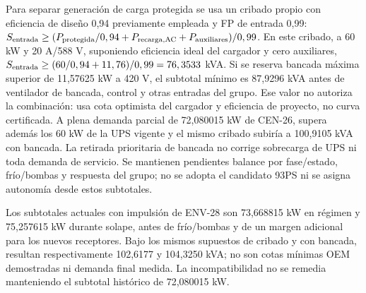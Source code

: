 Para separar generación de carga protegida se usa un cribado propio con eficiencia de diseño 0,94 previamente empleada y FP de entrada 0,99: $S_{\rm entrada}\ge(P_{\rm protegida}/0,94+P_{\rm recarga,AC}+P_{\rm auxiliares})/0,99$. En este cribado, a 60 kW y 20 A/588 V, suponiendo eficiencia ideal del cargador y cero auxiliares, $S_{\rm entrada}\ge(60/0,94+11,76)/0,99=76,3533$ kVA. Si se reserva bancada máxima superior de 11,57625 kW a 420 V, el subtotal mínimo es 87,9296 kVA antes de ventilador de bancada, control y otras entradas del grupo. Ese valor no autoriza la combinación: usa cota optimista del cargador y eficiencia de proyecto, no curva certificada. A plena demanda parcial de 72,080015 kW de CEN-26, supera además los 60 kW de la UPS vigente y el mismo cribado subiría a 100,9105 kVA con bancada. La retirada prioritaria de bancada no corrige sobrecarga de UPS ni toda demanda de servicio. Se mantienen pendientes balance por fase/estado, frío/bombas y respuesta del grupo; no se adopta el candidato 93PS ni se asigna autonomía desde estos subtotales.


Los subtotales actuales con impulsión de ENV-28 son 73,668815 kW en régimen y 75,257615 kW durante solape, antes de frío/bombas y de un margen adicional para los nuevos receptores. Bajo los mismos supuestos de cribado y con bancada, resultan respectivamente 102,6177 y 104,3250 kVA; no son cotas mínimas OEM demostradas ni demanda final medida. La incompatibilidad no se remedia manteniendo el subtotal histórico de 72,080015 kW.
